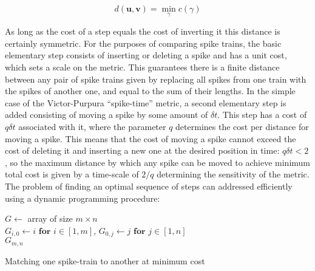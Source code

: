 \documentclass[12pt]{extarticle}
\begin{document}
\begin{equation}
d(\mathbf{u},\mathbf{v}) = \min_{\gamma} c(\gamma)
\end{equation}

\noindent
As long as the cost of a step equals the cost of inverting it this
distance is certainly symmetric. For the purposes of comparing spike
trains, the basic elementary step consists of inserting or deleting a
spike and has a unit cost, which sets a scale on the metric. This
guarantees there is a finite distance between any pair of spike trains
given by replacing all spikes from one train with the spikes of
another one, and equal to the sum of their lengths. In the simple case
of the Victor-Purpura ``spike-time'' metric, a second elementary step
is added consisting of moving a spike by some amount of $\delta
t$. This step has a cost of $q\delta t$ associated with it, where the
parameter $q$ determines the cost per distance for moving a
spike. This means that the cost of moving a spike cannot exceed the
cost of deleting it and inserting a new one at the desired position in
time: $q\delta t < 2$, so the maximum distance by which any spike can
be moved to achieve minimum total cost is given by a time-scale of
$2/q$ determining the sensitivity of the metric.\\

\noindent
The problem of finding an optimal sequence of steps can addressed
efficiently using a dynamic programming procedure:\\

\begin{algorithm}[H]
  $G \leftarrow$ array of size $m\times n $\\
  $G_{i,0}\leftarrow i$ $\mathbf{for}$ $i \in \left[1,m\right]$, $G_{0,j}\leftarrow j$ $\mathbf{for}$ $j \in \left[1,n\right]$\\
  \KwRet $G_{m,n}$\\
   \vspace{11pt} \caption{Matching one spike-train to another at minimum cost}
\end{algorithm}
\vspace{16pt}
\end{document}

